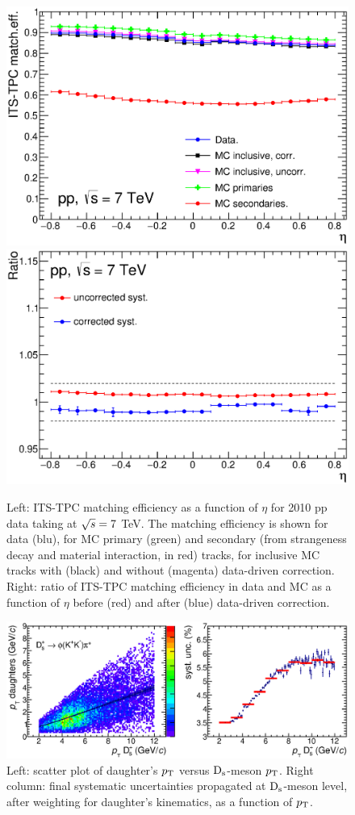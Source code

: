 \begin{figure}[!htb]
\begin{center}
\includegraphics[width=.49\textwidth]{FigCap4/ITSTPCmatchEff_10bpass4_vsEta.eps}
\includegraphics[width=.49\textwidth]{FigCap4/ITSTPCmatchEffSyst_10bpass4_vsEta.eps}
\caption{Left: ITS-TPC matching efficiency as a function of $\eta$ for 2010 pp data taking at $\sqrt{s} = 7$ TeV. The matching efficiency is shown for data (blu), for MC primary (green) and secondary (from strangeness decay and material interaction, in red) tracks, for inclusive MC tracks with (black) and without (magenta) data-driven correction. Right: ratio of ITS-TPC matching efficiency in data and MC as a function of $\eta$ before (red) and after (blue) data-driven correction.}
\label{fig:CorrMatchEffVsEta}
\end{center}
\end{figure}


\begin{figure}[!htb]
\begin{center}
\includegraphics[width=1\textwidth]{FigCap4/FinalSystMEDmesons_ppPass4.eps}
\caption{Left: scatter plot of daughter's $p_{\rm T}$ versus ${\rm D_s}$-meson $p_{\rm T}$. Right column: final systematic uncertainties propagated at ${\rm D_s}$-meson level, after weighting for daughter's kinematics, as a function of $p_{\rm T}$.}
\label{fig:SysMatchEffDmeson}
\end{center}
\end{figure}

